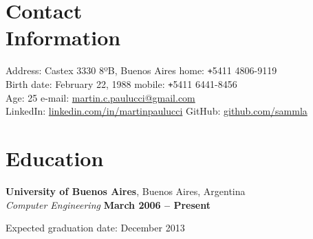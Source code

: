 \documentclass[margin,line]{resume}
\begin{document}
\begin{resume}

    \section{\mysidestyle Contact\\Information}

    Address: Castex 3330 8ºB, Buenos Aires                            \hfill home: \texttt{+}5411 4806-9119         \vspace{0mm}\\\vspace{0mm}%
    Birth date: February 22, 1988                          \hfill mobile: \texttt{+}5411 6441-8456         \vspace{0mm}\\\vspace{0mm}%
    Age: 25      \hfill e-mail: \href{mailto:martin.c.paulucci@gmail.com}{martin.c.paulucci@gmail.com}  \vspace{0mm}\\\vspace{0mm}%
    LinkedIn: \href{http://www.linkedin.com/in/martinpaulucci}{linkedin.com/in/martinpaulucci} \hfill GitHub: \href{https://github.com/sammla}{github.com/sammla} \vspace{0mm}\\\vspace{-4.5mm}%
    \section{\mysidestyle Education}

    \textbf{University of Buenos Aires}, Buenos Aires, Argentina \vspace{2mm}\\\vspace{1mm}%
    \textsl{Computer Engineering} \hfill \textbf{ March 2006 -- Present}\vspace{-3mm}\\\vspace{-1mm}%
    \begin{list2}
        \item Expected graduation date:  December 2013
    \end{list2}\vspace{-1.5mm}


\end{resume}
\end{document}
